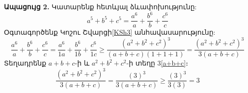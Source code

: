 \documentclass{article}
\numberwithin{equation}
\begin{document}
\textbf{Ապացույց 2.}
Կատարենք հետևյալ ձևափոխությունը:
\begin{equation}
 a^5+b^5+c^5=\frac{a^6}{a}+\frac{b^6}{b}+\frac{c^6}{c}
\end{equation}
Օգտագործենք Կոշու Շվարցի\eqref{KSh3} անհավասարությունը:
\begin{equation}
 \frac{a^6}{a}+\frac{b^6}{b}+\frac{c^6}{c}=\frac{a^6}{1a}+\frac{b^6}{1b}+\frac{c^6}{1c}\ge\frac{(a^2+b^2+c^2)^3}{(a+b+c)(1+1+1)} = \frac{(a^2+b^2+c^2)^3}{3(a+b+c)}
\end{equation}
Տեղադրենք $a+b+c$-ի և $a^2+b^2+c^2$-ի տեղը 3\eqref{a+b+c}։
\begin{equation}
 \frac{(a^2+b^2+c^2)^3}{3(a+b+c)}=\frac{(3)^3}{3(a+b+c)} \ge \frac{(3)^3}{3(3)}=3
\end{equation}
\end{document}
